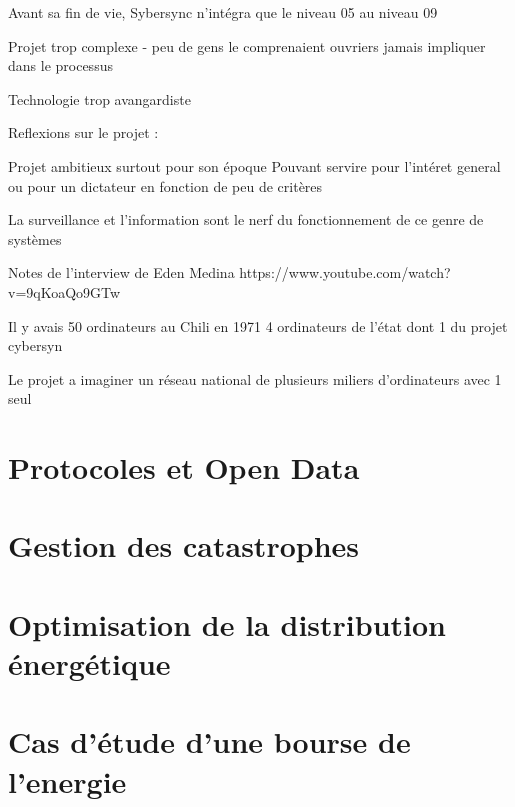 Avant sa fin de vie, Sybersync n'intégra que le niveau 05 au niveau 09

Projet trop complexe - peu de gens le comprenaient
ouvriers jamais impliquer dans le processus

Technologie trop avangardiste

Reflexions sur le projet :

Projet ambitieux surtout pour son époque
Pouvant servire pour l'intéret general ou pour un dictateur en fonction de peu de critères

La surveillance et l'information sont le nerf du fonctionnement de ce genre de systèmes


Notes de l'interview de Eden Medina
https://www.youtube.com/watch?v=9qKoaQo9GTw

Il y avais 50 ordinateurs au Chili en 1971
4 ordinateurs de l'état
dont 1 du projet cybersyn

Le projet a imaginer un réseau national de plusieurs miliers d'ordinateurs
avec 1 seul

\section{Protocoles et Open Data}
\section{Gestion des catastrophes}
\section{Optimisation de la distribution énergétique}
\section{Cas d'étude d'une bourse de l'energie}
